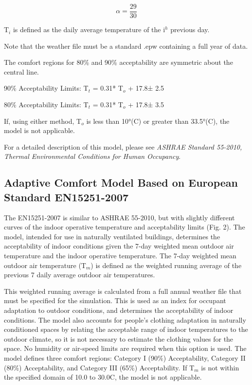 \begin{equation}
\alpha  = \frac{{29}}{{30}}
\end{equation}

T\(_{i}\) is defined as the daily average temperature of the i\(^{h}\) previous day.

Note that the weather file must be a standard .epw containing a full year of data.

The comfort regions for 80\% and 90\% acceptability are symmetric about the central line.

90\% Acceptability Limits: T\(_{t}\) = 0.31* T\(_{o}\) + 17.8± 2.5

80\% Acceptability Limits: T\(_{t}\) = 0.31* T\(_{o}\) + 17.8± 3.5

If, using either method, T\(_{o}\) is less than 10°(C) or greater than 33.5°(C), the model is not applicable.

For a detailed description of this model, please see \emph{ASHRAE Standard 55-2010, Thermal Environmental Conditions for Human Occupancy}.

\subsection{Adaptive Comfort Model Based on European Standard EN15251-2007}\label{adaptive-comfort-model-based-on-european-standard-en15251-2007}

The EN15251-2007 is similar to ASHRAE 55-2010, but with slightly different curves of the indoor operative temperature and acceptability limits (Fig. 2). The model, intended for use in naturally ventilated buildings, determines the acceptability of indoor conditions given the 7-day weighted mean outdoor air temperature and the indoor operative temperature. The 7-day weighted mean outdoor air temperature (T\(_{m}\)) is defined as the weighted running average of the previous 7 daily average outdoor air temperatures.

This weighted running average is calculated from a full annual weather file that must be specified for the simulation. This is used as an index for occupant adaptation to outdoor conditions, and determines the acceptability of indoor conditions. The model also accounts for people's clothing adaptation in naturally conditioned spaces by relating the acceptable range of indoor temperatures to the outdoor climate, so it is not necessary to estimate the clothing values for the space. No humidity or air-speed limits are required when this option is used. The model defines three comfort regions: Category I (90\%) Acceptability, Category II (80\%) Acceptability, and Category III (65\%) Acceptability. If T\(_{m}\) is not within the specified domain of 10.0 to 30.0C, the model is not applicable.

